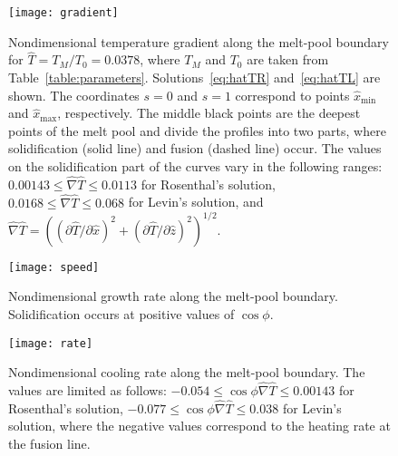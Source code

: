 \documentclass{article}
\begin{document}
\begin{figure}
    \centering
    \texttt{[image: gradient]}
    \caption{
        Nondimensional temperature gradient along the melt-pool boundary for $\hat{T}=T_M/T_0=0.0378$,
        where $T_M$ and $T_0$ are taken from Table~\ref{table:parameters}.
        Solutions~\eqref{eq:hatTR} and~\eqref{eq:hatTL} are shown.
        The coordinates $s=0$ and $s=1$ correspond to points $\hat{x}_\text{min}$ and $\hat{x}_\text{max}$, respectively.
        The middle black points are the deepest points of the melt pool and divide the profiles into two parts,
        where solidification (solid line) and fusion (dashed line) occur.
        The values on the solidification part of the curves vary in the following ranges:
        $0.00143 \leq \hat{\nabla}\hat{T} \leq 0.0113$ for Rosenthal's solution,
        $0.0168 \leq \hat{\nabla}\hat{T} \leq 0.068$ for Levin's solution,
        and $\hat{\nabla}\hat{T} = ((\partial\hat{T}/\partial\hat{x})^2 + (\partial\hat{T}/\partial\hat{z})^2)^{1/2}$.
    }\label{fig:gradient}
\end{figure}

\begin{figure}
    \centering
    \texttt{[image: speed]}
    \caption{
        Nondimensional growth rate along the melt-pool boundary.
        Solidification occurs at positive values of $\cos\phi$.
    }\label{fig:speed}
\end{figure}

\begin{figure}
    \centering
    \texttt{[image: rate]}
    \caption{
        Nondimensional cooling rate along the melt-pool boundary.
        The values are limited as follows:
        $-0.054\leq \cos\phi\hat{\nabla}\hat{T} \leq 0.00143$ for Rosenthal's solution,
        $-0.077\leq \cos\phi\hat{\nabla}\hat{T} \leq 0.038$ for Levin's solution,
        where the negative values correspond to the heating rate at the fusion line.
    }\label{fig:rate}
\end{figure}
\end{document}
